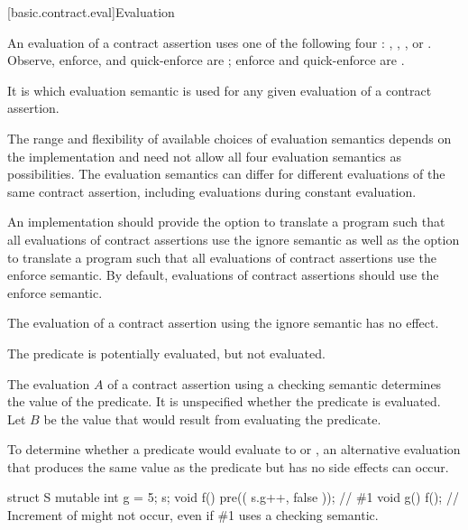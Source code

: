 [basic.contract.eval]{Evaluation}

\pnum
{}%
%
%
An evaluation of a contract assertion
uses one of the following four :
,
,
, or
.
Observe, enforce, and quick-enforce are ;
enforce and quick-enforce are .

\pnum
It is
which evaluation semantic is used
for any given evaluation of a contract assertion.
\begin{note}
The range and flexibility of available choices of
evaluation semantics depends on the implementation
and need not allow all four evaluation semantics as possibilities.
The evaluation semantics can differ
for different evaluations of the same contract assertion,
including evaluations during constant evaluation.
\end{note}

\pnum
\recommended
An implementation should provide
the option to translate a program
such that all evaluations of contract assertions use the ignore semantic
as well as
the option to translate a program
such that all evaluations of contract assertions use the enforce semantic.
By default,
evaluations of contract assertions should use the enforce semantic.

\pnum
The evaluation of a contract assertion using the ignore semantic has no effect.
\begin{note}
The predicate is potentially evaluated,
but not evaluated.
\end{note}

\pnum
The evaluation $A$ of a contract assertion
using a checking semantic
determines the value of the predicate.
It is unspecified
whether the predicate is evaluated.
Let $B$ be the value that would result from evaluating the predicate.
\begin{note}
To determine whether a predicate would evaluate
to  or ,
an alternative evaluation
that produces the same value as the predicate
but has no side effects
can occur.
\begin{example}
\begin{codeblock}
struct S {
  mutable int g = 5;
} s;
void f()
  pre(( s.g++, false ));    // \#1
void g()
{
  f();  // Increment of  might not occur, even if \#1 uses a checking semantic.
}
\end{codeblock}
\end{example}
\end{note}

